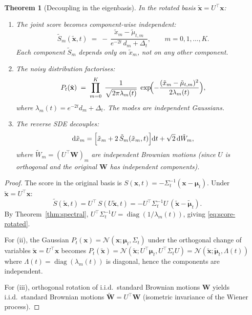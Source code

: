 \documentclass[11pt,a4paper]{article}
\newtheorem{theorem}{Theorem}[section]
\newcommand{\diag}{\operatorname{diag}}
\newcommand{\Dt}{\Delta_t}
\begin{document}
\begin{theorem}[Decoupling in the eigenbasis]\label{thm:decoupling}
In the rotated basis $\tilde{\mathbf{x}} = U^\top \mathbf{x}$:
\begin{enumerate}[label=(\roman*), nosep]
  \item The joint score becomes component-wise independent:
  \begin{equation}\label{eq:score-rotated}
    \tilde{S}_m(\tilde{\mathbf{x}}, t) \;=\; -\,\frac{\tilde{x}_m - \tilde{\mu}_{t,m}}{e^{-2t}\,d_m + \Dt}, \qquad m = 0, 1, \dots, K.
  \end{equation}
  Each component $\tilde{S}_m$ depends only on $\tilde{x}_m$, not on any other component.
  \item The noisy distribution factorises:
  \begin{equation}\label{eq:pt-factored}
    P_t(\tilde{\mathbf{x}}) \;=\; \prod_{m=0}^{K}\;\frac{1}{\sqrt{2\pi\lambda_m(t)}}\;\exp\!\Bigl(-\frac{(\tilde{x}_m - \tilde{\mu}_{t,m})^2}{2\lambda_m(t)}\Bigr),
  \end{equation}
  where $\lambda_m(t) = e^{-2t}d_m + \Dt$.  The modes are independent Gaussians.
  \item The reverse SDE decouples:
  \begin{equation}\label{eq:reverse-sde-rotated}
    \mathrm{d}\tilde{x}_m = \Bigl[\tilde{x}_m + 2\,\tilde{S}_m(\tilde{x}_m, t)\Bigr]\mathrm{d}t + \sqrt{2}\,\mathrm{d}\tilde{W}_m,
  \end{equation}
  where $\tilde{W}_m = (U^\top \mathbf{W})_m$ are independent Brownian motions (since $U$ is orthogonal and the original $\mathbf{W}$ has independent components).
\end{enumerate}
\end{theorem}

\begin{proof}
The score in the original basis is $S(\mathbf{x}, t) = -\Sigma_t^{-1}(\mathbf{x} - \bm{\mu}_t)$.  Under $\tilde{\mathbf{x}} = U^\top \mathbf{x}$:
\[
  \tilde{S}(\tilde{\mathbf{x}}, t) = U^\top\,S(U\tilde{\mathbf{x}}, t) = -U^\top\Sigma_t^{-1}U\,(\tilde{\mathbf{x}} - \tilde{\bm{\mu}}_t).
\]
By Theorem~\ref{thm:spectral}, $U^\top \Sigma_t^{-1} U = \diag(1/\lambda_m(t))$, giving \eqref{eq:score-rotated}.

For (ii), the Gaussian $P_t(\mathbf{x}) = \mathcal{N}(\mathbf{x}; \bm{\mu}_t, \Sigma_t)$ under the orthogonal change of variables $\tilde{\mathbf{x}} = U^\top \mathbf{x}$ becomes $P_t(\tilde{\mathbf{x}}) = \mathcal{N}(\tilde{\mathbf{x}}; U^\top\bm{\mu}_t, U^\top\Sigma_t U) = \mathcal{N}(\tilde{\mathbf{x}}; \tilde{\bm{\mu}}_t, \Lambda(t))$ where $\Lambda(t) = \diag(\lambda_m(t))$ is diagonal, hence the components are independent.

For (iii), orthogonal rotation of i.i.d.\ standard Brownian motions $\mathbf{W}$ yields i.i.d.\ standard Brownian motions $\tilde{\mathbf{W}} = U^\top \mathbf{W}$ (isometric invariance of the Wiener process).
\end{proof}
\end{document}
